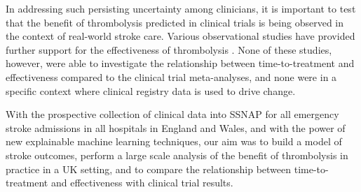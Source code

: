 
In addressing such persisting uncertainty among clinicians, it is important to test that the benefit of thrombolysis predicted in clinical trials is being observed in the context of real-world stroke care. Various observational studies have provided further support for the effectiveness of thrombolysis \cite{wahlgren_thrombolysis_2007, wahlgren_thrombolysis_2008}. None of these studies, however, were able to investigate the relationship between time-to-treatment and effectiveness compared to the clinical trial meta-analyses, and none were in a specific context where clinical registry data is used to drive change.

With the prospective collection of clinical data into SSNAP for all emergency stroke admissions in all hospitals in England and Wales, and with the power of new explainable machine learning techniques, our aim was to build a model of stroke outcomes, perform a large scale analysis of the benefit of thrombolysis in practice in a UK setting, and to compare the relationship between time-to-treatment and effectiveness with clinical trial results.